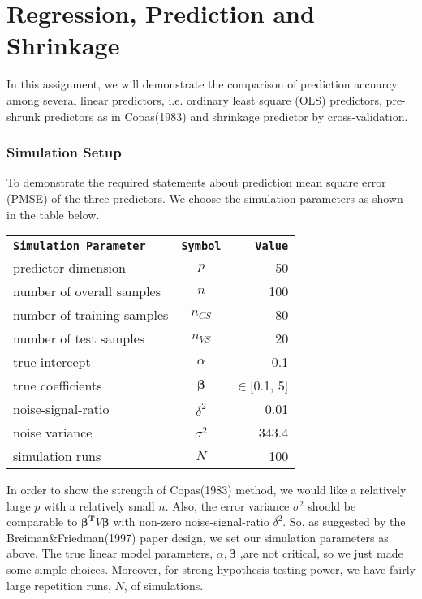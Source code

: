 \documentclass{article}\usepackage{graphicx, color}
\begin{document}
\section*{Regression, Prediction and Shrinkage}
In this assignment, we will demonstrate the comparison of prediction
accuarcy among several linear predictors, i.e. ordinary least square
(OLS) predictors, pre-shrunk predictors as in Copas(1983) and shrinkage
predictor by cross-validation.

\subsubsection*{Simulation Setup}
\hspace{12 pt} 
To demonstrate the required statements about prediction mean square
error (PMSE) of the three predictors. We choose the simulation
parameters as shown in the table below.




\begin{center}
\begin{tabular}{l|c|r} \hline
\texttt{Simulation Parameter} & \texttt{Symbol} & \texttt{Value}  \\ \hline
predictor dimension & $p$ & 50 \\ \hline
number of overall samples & $n$ & 100 \\
number of training samples & $n_{CS}$ & 80 \\
number of test samples & $n_{VS}$ & 20 \\ \hline
true intercept & $\alpha$ & 0.1 \\ 
true coefficients & $\bm{\beta}$ &  $\in$[0.1, 5]\\ \hline
noise-signal-ratio & $\delta^2$ & 0.01 \\
noise variance & $\sigma^2$ & 343.4 \\ \hline
simulation runs & $N$ & 100 \\ \hline
\end{tabular}
\end{center}

In order to show the strength of Copas(1983) method, we would like a
relatively large $p$ with a relatively small $n$. Also, the error
variance $\sigma^2$ should be comparable to $\bm{\beta^T}V\bm{\beta}$
with non-zero noise-signal-ratio $\delta^2$. So, as suggested by the
Breiman\&Friedman(1997) paper design, we set our simulation parameters
as above. The true linear model parameters, $\alpha, \bm{\beta}$ ,are not critical, so we
just made some simple choices. Moreover, for strong hypothesis testing
power, we have fairly large repetition runs, $N$, of simulations.
\end{document}
